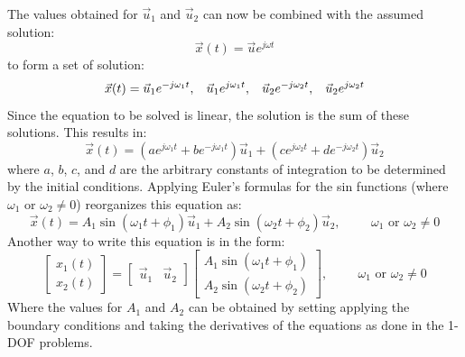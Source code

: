 \documentclass[12pt,letter]{article}
\numberwithin{ex}{section} %
\numberwithin{re}{section} %
\begin{document}
The values obtained for $\vec{u}_1$ and $\vec{u}_2$ can now be combined with the assumed solution:
\begin{equation}
	\vec{x}(t) = \vec{u}e^{j\omega t}
\end{equation}
to form a set of solution:
\begin{equation}
	\vec{x}(t) = \vec{u}_1e^{-j\omega_1 t}, \hspace{2ex} \vec{u}_1e^{j\omega_1 t}, \hspace{2ex} \vec{u}_2e^{-j\omega_2 t}, \hspace{2ex} \vec{u}_2e^{j\omega_2 t}
\end{equation}
Since the equation to be solved is linear, the solution is the sum of these solutions. This results in:
\begin{equation}
	\vec{x}(t) = (a e^{j\omega_1 t} + b e^{-j\omega_1 t})\vec{u}_1 +(c e^{j\omega_2 t} + d e^{-j\omega_2 t})\vec{u}_2
\end{equation}
where $a$, $b$, $c$, and $d$ are the arbitrary constants of integration to be determined by the initial conditions. Applying Euler's formulas for the sin functions (where $\omega_1 \text{ or } \omega_2 \neq 0$) reorganizes this equation as:
\begin{equation}
	\vec{x}(t) = A_1 \sin (\omega_1 t + \phi_1 )\vec{u}_1 + A_2 \sin (\omega_2 t + \phi_2 )\vec{u}_2 , \hspace{1cm} \omega_1 \text{ or } \omega_2 \neq 0
\end{equation}
Another way to write this equation is in the form:
\begin{equation}
	 \begin{bmatrix} x_1(t) \\  x_2(t) \end{bmatrix} =  \begin{bmatrix} \vec{u}_1 & \vec{u}_2 \end{bmatrix}
	 \begin{bmatrix} A_1 \sin (\omega_1 t + \phi_1 )\\ A_2 \sin (\omega_2 t + \phi_2 )\end{bmatrix}, \hspace{1cm} \omega_1 \text{ or } \omega_2 \neq 0
\end{equation}
Where the values for $A_1$ and $A_2$ can be obtained by setting applying the boundary conditions and taking the derivatives of the equations as done in the 1-DOF problems. 
\end{document}
